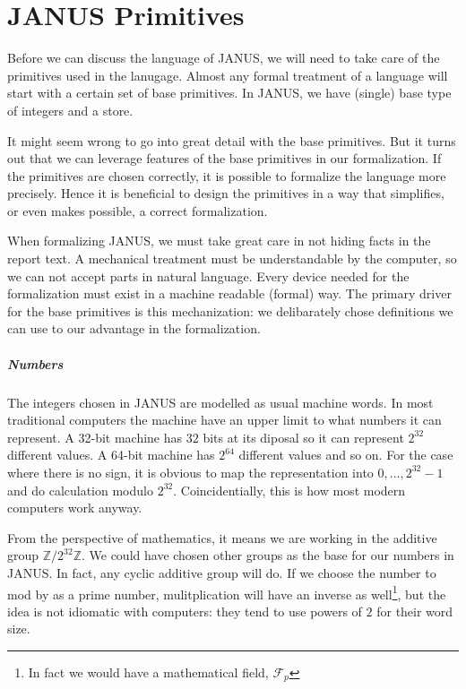 \chapter{JANUS Primitives}


Before we can discuss the language of JANUS, we will need to take care
of the primitives used in the lanugage. Almost any formal treatment of
a language will start with a certain set of base primitives. In JANUS,
we have (single) base type of integers and a store.

It might seem wrong to go into great detail with the base
primitives. But it turns out that we can leverage features of the base
primitives in our formalization. If the primitives are chosen
correctly, it is possible to formalize the language more
precisely. Hence it is beneficial to design the primitives in a way
that simplifies, or even makes possible, a correct formalization.

When formalizing JANUS, we must take great care in not hiding facts in
the report text. A mechanical treatment must be understandable by the
computer, so we can not accept parts in natural language. Every device
needed for the formalization must exist in a machine readable (formal)
way. The primary driver for the base primitives is this mechanization:
we delibarately chose definitions we can use to our advantage in the
formalization.

\paragraph{Numbers}

The integers chosen in JANUS are modelled as usual machine words. In
most traditional computers the machine have an upper limit to what
numbers it can represent. A 32-bit machine has $32$ bits at its
diposal so it can represent $2^{32}$ different values. A 64-bit
machine has $2^{64}$ different values and so on. For the case where
there is no sign, it is obvious to map the representation into $0,
\dotsc, 2^{32}-1$ and do calculation modulo $2^{32}$. Coincidentially,
this is how most modern computers work anyway.

From the perspective of mathematics, it means we are working in the
additive group $\mathbb{Z}/2^{32}\mathbb{Z}$. We could have chosen
other groups as the base for our numbers in JANUS. In fact, any cyclic
additive group will do. If we choose the number to mod by as a prime
number, mulitplication will have an inverse as well\footnote{In fact
  we would have a mathematical field, $\mathcal{F}_p$}, but the idea
is not idiomatic with computers: they tend to use powers of $2$ for
their word size.

